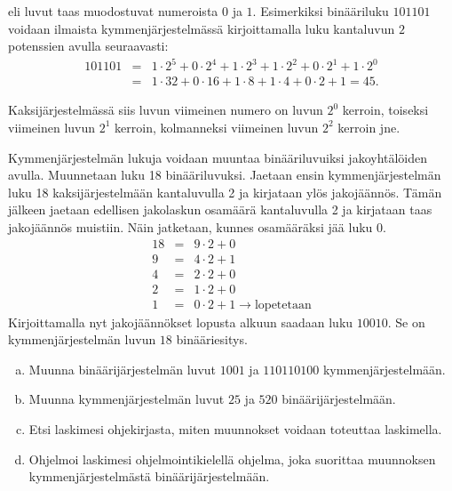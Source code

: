 \begin{kotitehtavasivu}
\begin{tehtava}
	 eli  luvut taas muodostuvat numeroista $0$ ja $1$. Esimerkiksi binääriluku $101101$ voidaan ilmaista kymmenjärjestelmässä kirjoittamalla luku kantaluvun $2$ potenssien avulla seuraavasti:
	\begin{eqnarray*}
	101101&=&1\cdot2^5+0\cdot2^4+1\cdot2^3+1\cdot2^2+0\cdot2^1+1\cdot2^0 \\
	&=& 1\cdot32+0\cdot16+1\cdot8+1\cdot4+0\cdot2+1=45.
	\end{eqnarray*}

	Kaksijärjestelmässä siis luvun viimeinen numero on luvun $2^0$ kerroin, toiseksi viimeinen luvun $2^1$ kerroin, kolmanneksi viimeinen luvun $2^2$ kerroin jne.

	Kymmenjärjestelmän lukuja voidaan muuntaa binääriluvuiksi jakoyhtälöiden avulla. Muunnetaan luku 18 binääriluvuksi. Jaetaan ensin kymmenjärjestelmän luku 18 kaksijärjestelmään kantaluvulla 2 ja kirjataan ylös jakojäännös. Tämän jälkeen jaetaan edellisen jakolaskun osamäärä kantaluvulla 2 ja kirjataan taas jakojäännös muistiin. Näin jatketaan, kunnes osamääräksi jää luku 0. 
	\begin{eqnarray*}
	18&=&9\cdot 2+0\\
	9&=&4\cdot 2+1\\
	4&=&2\cdot 2+0\\
	2&=&1\cdot 2+0\\
	1&=&0\cdot2+1 \to \textrm{lopetetaan}
	\end{eqnarray*}
	Kirjoittamalla nyt jakojäännökset lopusta alkuun saadaan luku $10010$. Se on kymmenjärjestelmän luvun $18$ binääriesitys.
	\begin{enumerate}[a)]
	\item Muunna binäärijärjestelmän luvut $1001$ ja $110110100$ kymmenjärjestelmään.
	\item Muunna kymmenjärjestelmän luvut $25$ ja $520$ binäärijärjestelmään.
	\item Etsi laskimesi ohjekirjasta, miten muunnokset voidaan toteuttaa laskimella.
	\item Ohjelmoi laskimesi ohjelmointikielellä ohjelma, joka suorittaa muunnoksen kymmenjärjestelmästä binäärijärjestelmään.
	\end{enumerate}
\end{tehtava}

\end{kotitehtavasivu}
